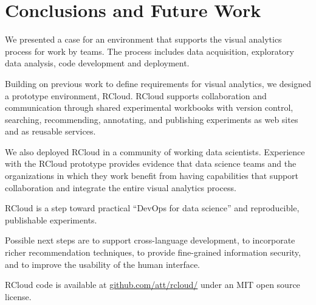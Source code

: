 \section{Conclusions and Future Work}


We presented a case for an environment that supports the
visual analytics process for work by teams. The process
includes data acquisition, exploratory data analysis,
code development and deployment.

Building on previous work to define requirements for
visual analytics, we designed a prototype environment, RCloud.
RCloud supports collaboration and communication
through shared experimental workbooks with version
control, searching, recommending, annotating, and publishing
experiments as web sites and as reusable services. 

We also deployed RCloud in a community of working data scientists.
Experience with the RCloud prototype provides evidence that data
science teams and the organizations in which they work benefit from
having capabilities that support collaboration and integrate
the entire visual analytics process.

RCloud is a step toward practical ``DevOps for data science'' and
reproducible, publishable experiments.

Possible next steps are to support cross-language development,
to incorporate richer recommendation techniques, to provide fine-grained
information security, and to improve the usability of the human interface.

RCloud code is available at \url{github.com/att/rcloud/}
under an MIT open source license.
